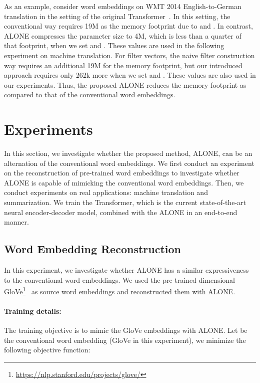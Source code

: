 \documentclass{article}
\begin{document}
As an example, consider word embeddings on WMT 2014 English-to-German translation in the setting of the original Transformer~\cite{NIPS2017_7181}.
In this setting, the conventional way requires 19M as the memory footprint due to  and .
In contrast, ALONE compresses the parameter size to 4M, which is less than a quarter of that footprint, when we set  and .
These values are used in the following experiment on machine translation.
For filter vectors, the naive filter construction way requires an additional 19M for the memory footprint, but our introduced approach requires only 262k more when we set  and .
These values are also used in our experiments.
Thus, the proposed ALONE reduces the memory footprint as compared to that of the conventional word embeddings.


\section{Experiments}
In this section, we investigate whether the proposed method, ALONE, can be an alternation of the conventional word embeddings.
We first conduct an experiment on the reconstruction of pre-trained word embeddings to investigate whether ALONE is capable of mimicking the conventional word embeddings.
Then, we conduct experiments on real applications: machine translation and summarization.
We train the Transformer, which is the current state-of-the-art neural encoder-decoder model, combined with the ALONE in an end-to-end manner.


\subsection{Word Embedding Reconstruction}\label{sec:word_reconstruction}
In this experiment, we investigate whether ALONE has a similar expressiveness to the conventional word embeddings.
We used the pre-trained  dimensional GloVe\footnote{\href{https://nlp.stanford.edu/projects/glove/}{https://nlp.stanford.edu/projects/glove/}}~\cite{pennington2014glove} as source word embeddings and reconstructed them with ALONE.


\paragraph{Training details:}
The training objective is to mimic the GloVe embeddings with ALONE.
Let  be the conventional word embedding (GloVe in this experiment), we minimize the following objective function:
\end{document}
